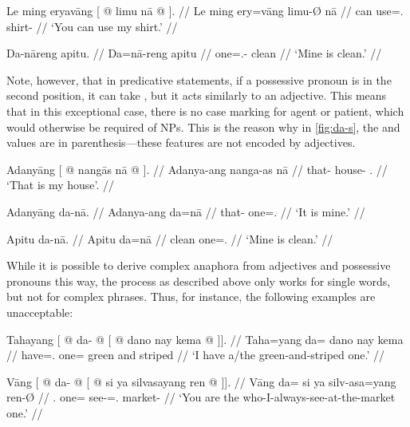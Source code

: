 \pex
\a\begingl
	\gla Le ming eryavāng {\normalfont [} @ limu nā @ 
			{\normalfont ]}. //
	\glb Le ming ery=vāng {} limu-Ø nā {} //
	\glc \PatTI{} can use=\Second{}.\Aarg{} {} shirt-\Top{} {} //
	\glft `You can use my shirt.' //
\endgl

\a\begingl
	\gla Da-nāreng apitu. //
	\glb Da=nā-reng apitu //
	\glc one=\Fsg{}.\Gen{}-\AargI{} clean //
	\glft `Mine is clean.' //
\endgl

\xe

Note, however, that in predicative statements, if a possessive pronoun is in the
second position, it can take , but it acts similarly to an
adjective. This means that in this exceptional case, there is no case marking
for agent or patient, which would otherwise be required of NPs. This is the 
reason why in \autoref{fig:da-s}, the \Pers{} and \Def{} values are in 
parenthesis---these features are not encoded by adjectives.

\pex
\a\begingl
	\gla Adanyāng {\normalfont [} @ nangās nā @ 
		{\normalfont ]}. //
	\glb Adanya-ang {} nanga-as nā {} //
	\glc that-\Aarg{} {} house-\Parg{} \Fsg{}.\Gen{} {} //
	\glft `That is my house'. //
\endgl

\a\begingl
	\gla Adanyāng da-nā. //
	\glb Adanya-ang da=nā //
	\glc that-\Aarg{} one=\Fsg{}.\Gen{} //
	\glft `It is mine.' //
\endgl

\a\begingl
	\gla Apitu da-nā. //
	\glb Apitu da=nā //
	\glc clean one=\Fsg{}.\Gen{} //
	\glft `Mine is clean.' //
\endgl

\xe

While it is possible to derive complex anaphora from adjectives and possessive
pronouns this way, the process as described above only works for single 
words, but not for complex phrases. Thus, for instance, the following examples
are unacceptable:

\pex
\a\label{ex:suchadjp}\ljudge*\begingl
	\gla Tahayang {\normalfont [} @ da- @ {\normalfont 
		[} @ dano nay kema @ {\normalfont]]}. //
	\glb Taha=yang {} da= {} dano nay kema {} //
	\glc have=\Fsg{}.\Aarg{} {} one= {} green and striped {} //
	\glft `I have a/the green-and-striped one.' //
\endgl

\a\label{ex:suchrelc}\ljudge*\begingl
	\gla Vāng {\normalfont [} @ da- @ {\normalfont[} 
		@ si ya silvasayang ren @ {\normalfont ]]}. //
	\glb Vāng {} da= {} si ya silv-asa=yang ren-Ø {} //
	\glc \Second.\Aarg{} {} one= {} \Rel{} \LocT{} 
		see-\Hab{}=\Fsg{}.\Aarg{} market-\Top{} {} //
	\glft `You are the who-I-always-see-at-the-market one.' //
\endgl
\xe

